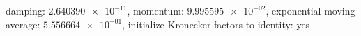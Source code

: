 damping: $\num[scientific-notation=true]{2.640390e-11}$, momentum: $\num[scientific-notation=true]{9.995595e-02}$, exponential moving average: $\num[scientific-notation=true]{5.556664e-01}$, initialize Kronecker factors to identity: yes